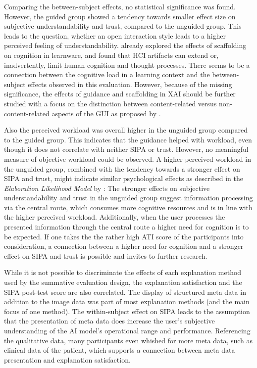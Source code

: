 \documentclass[11pt,a4paper,english]{scrreprt}
\begin{document}
Comparing the between-subject effects, no statistical significance was found. However, the guided group showed a tendency towards smaller effect size on subjective understandability and trust, compared to the unguided group. This leads to the question, whether an open interaction style leads to a higher perceived feeling of understandability. \textcite{sedig_role_2001} already explored the effects of scaffolding on cognition in learnware, and found that HCI artifacts can extend or, inadvertently, limit human cognition and thought processes. There seems to be a connection between the cognitive load in a learning context and the between-subject effects observed in this evaluation. However, because of the missing significance, the effects of guidance and scaffolding in XAI should be further studied with a focus on the distinction between content-related versus non-content-related aspects of the GUI as proposed by \textcite{sedig_role_2001}.

Also the perceived workload was overall higher in the unguided group compared to the guided group. This indicates that the guidance helped with workload, even though it does not correlate with neither SIPA or trust. However, no meaningful measure of objective workload could be observed. A higher perceived workload in the unguided group, combined with the tendency towards a stronger effect on SIPA and trust, might indicate similar psychological effects as described in the \textit{Elaboration Likelihood Model} by \textcite{petty_elaboration_1986}: The stronger effects on subjective understandability and trust in the unguided group suggest information processing via the central route, which consumes more cognitive resources and is in line with the higher perceived workload. Additionally, when the user processes the presented information through the central route a higher need for cognition is to be expected. If one takes the the rather high ATI score of the participants into consideration, a connection between a higher need for cognition and a stronger effect on SIPA and trust is possible and invites to further research.

While it is not possible to discriminate the effects of each explanation method used by the summative evaluation design, the explanation satisfaction and the SIPA post-test score are also correlated. The display of structured meta data in addition to the image data was part of most explanation methods (and the main focus of one method). The within-subject effect on SIPA leads to the assumption that the presentation of meta data does increase the user's subjective understanding of the AI model's operational range and performance. Referencing the qualitative data, many participants even whished for more meta data, such as clinical data of the patient, which supports a connection between meta data presentation and explanation satisfaction.
\end{document}
